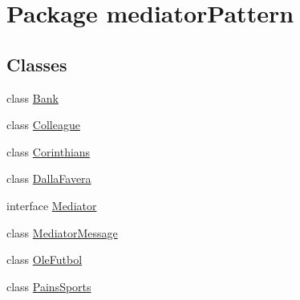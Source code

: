 \hypertarget{namespacemediator_pattern}{}\section{Package mediator\+Pattern}
\label{namespacemediator_pattern}
\subsection*{Classes}
\begin{DoxyCompactItemize}
\item 
class \mbox{\hyperlink{classmediator_pattern_1_1_bank}{Bank}}
\item 
class \mbox{\hyperlink{classmediator_pattern_1_1_colleague}{Colleague}}
\item 
class \mbox{\hyperlink{classmediator_pattern_1_1_corinthians}{Corinthians}}
\item 
class \mbox{\hyperlink{classmediator_pattern_1_1_dalla_favera}{Dalla\+Favera}}
\item 
interface \mbox{\hyperlink{interfacemediator_pattern_1_1_mediator}{Mediator}}
\item 
class \mbox{\hyperlink{classmediator_pattern_1_1_mediator_message}{Mediator\+Message}}
\item 
class \mbox{\hyperlink{classmediator_pattern_1_1_ole_futbol}{Ole\+Futbol}}
\item 
class \mbox{\hyperlink{classmediator_pattern_1_1_pains_sports}{Pains\+Sports}}
\end{DoxyCompactItemize}
